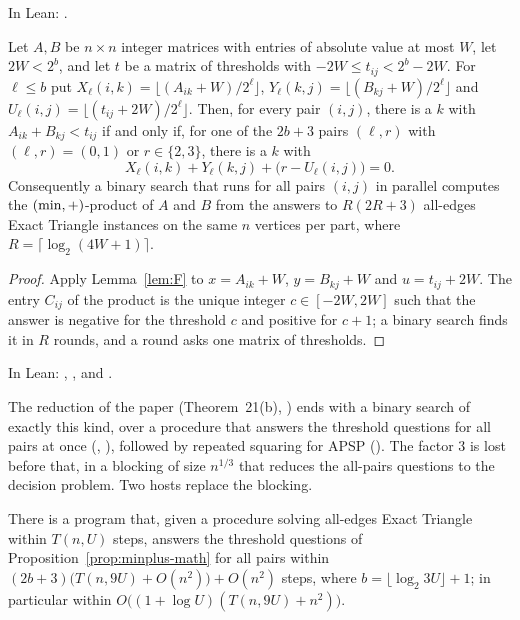 In Lean: .

\begin{proposition}\label{prop:minplus-math}
Let \(A,B\) be \(n\times n\) integer matrices with entries of absolute value at
most \(W\), let \(2W<2^{b}\), and let \(t\) be a matrix of thresholds with
\(-2W\le t_{ij}<2^{b}-2W\).  For \(\ell\le b\) put
\(X_\ell(i,k)=\lfloor(A_{ik}+W)/2^{\ell}\rfloor\),
\(Y_\ell(k,j)=\lfloor(B_{kj}+W)/2^{\ell}\rfloor\) and
\(U_\ell(i,j)=\lfloor(t_{ij}+2W)/2^{\ell}\rfloor\).  Then, for every pair
\((i,j)\), there is a \(k\) with \(A_{ik}+B_{kj}<t_{ij}\) if and only if, for
one of the \(2b+3\) pairs \((\ell,r)\) with \((\ell,r)=(0,1)\) or
\(r\in\{2,3\}\), there is a \(k\) with
\[
  X_\ell(i,k)+Y_\ell(k,j)+\bigl(r-U_\ell(i,j)\bigr)=0 .
\]
Consequently a binary search that runs for all pairs \((i,j)\) in parallel
computes the \((\min,+)\)-product of \(A\) and \(B\) from the answers to
\(R(2R+3)\) all-edges Exact Triangle instances on the same \(n\) vertices per
part, where \(R=\lceil\log_2(4W+1)\rceil\).
\end{proposition}

\begin{proof}
Apply Lemma~\ref{lem:F} to \(x=A_{ik}+W\), \(y=B_{kj}+W\) and
\(u=t_{ij}+2W\).  The entry \(C_{ij}\) of the product is the unique integer
\(c\in[-2W,2W]\) such that the answer is negative for the threshold \(c\) and
positive for \(c+1\); a binary search finds it in \(R\) rounds, and a round
asks one matrix of thresholds.
\end{proof}

In Lean: , ,
 and .

The reduction of the paper (Theorem~21(b), \cite{VW18}) ends with a binary search of
exactly this kind, over a procedure that answers the threshold questions for
all pairs at once (, ), followed by
repeated squaring for APSP ().  The factor \(3\) is
lost before that, in a blocking of size \(n^{1/3}\) that reduces the all-pairs
questions to the decision problem.  Two hosts replace the blocking.

\begin{theorem}\label{thm:pairs}
There is a program that, given a procedure solving all-edges Exact Triangle
within \(T(n,U)\) steps, answers the threshold questions of
Proposition~\ref{prop:minplus-math} for all pairs within
\((2b+3)\bigl(T(n,9U)+O(n^{2})\bigr)+O(n^{2})\) steps, where
\(b=\lfloor\log_2 3U\rfloor+1\); in particular within
\(O\bigl((1+\log U)(T(n,9U)+n^{2})\bigr)\).
\end{theorem}

